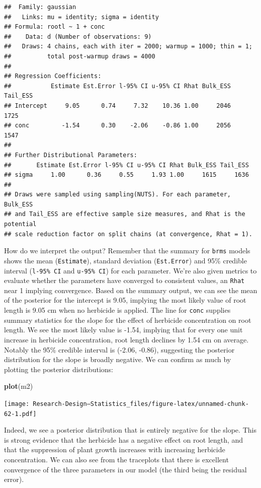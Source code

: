 \documentclass[
]{book}
\newenvironment{Shaded}{\begin{snugshade}}{\end{snugshade}}
\newcommand{\FunctionTok}[1]{\textcolor[rgb]{0.13,0.29,0.53}{\textbf{#1}}}
\newcommand{\NormalTok}[1]{#1}
\begin{document}
\begin{verbatim}
##  Family: gaussian 
##   Links: mu = identity; sigma = identity 
## Formula: rootl ~ 1 + conc 
##    Data: d (Number of observations: 9) 
##   Draws: 4 chains, each with iter = 2000; warmup = 1000; thin = 1;
##          total post-warmup draws = 4000
## 
## Regression Coefficients:
##           Estimate Est.Error l-95% CI u-95% CI Rhat Bulk_ESS Tail_ESS
## Intercept     9.05      0.74     7.32    10.36 1.00     2046     1725
## conc         -1.54      0.30    -2.06    -0.86 1.00     2056     1547
## 
## Further Distributional Parameters:
##       Estimate Est.Error l-95% CI u-95% CI Rhat Bulk_ESS Tail_ESS
## sigma     1.00      0.36     0.55     1.93 1.00     1615     1636
## 
## Draws were sampled using sampling(NUTS). For each parameter, Bulk_ESS
## and Tail_ESS are effective sample size measures, and Rhat is the potential
## scale reduction factor on split chains (at convergence, Rhat = 1).
\end{verbatim}

How do we interpret the output? Remember that the summary for \texttt{brms} models shows the mean (\texttt{Estimate}), standard deviation (\texttt{Est.Error}) and 95\% credible interval (\texttt{l-95\%\ CI} and \texttt{u-95\%\ CI}) for each parameter. We're also given metrics to evaluate whether the parameters have converged to consistent values, an \texttt{Rhat} near 1 implying convergence. Based on the summary output, we can see the mean of the posterior for the intercept is 9.05, implying the most likely value of root length is 9.05 cm when no herbicide is applied. The line for \texttt{conc} supplies summary statistics for the slope for the effect of herbicide concentration on root length. We see the most likely value is -1.54, implying that for every one unit increase in herbicide concentration, root length declines by 1.54 cm on average. Notably the 95\% credible interval is (-2.06, -0.86), suggesting the posterior distribution for the slope is broadly negative. We can confirm as much by plotting the posterior distributions:

\begin{Shaded}
\begin{Highlighting}[]
\FunctionTok{plot}\NormalTok{(m2)}
\end{Highlighting}
\end{Shaded}

\texttt{[image: Research-Design---Statistics\_files/figure-latex/unnamed-chunk-62-1.pdf]}

Indeed, we see a posterior distribution that is entirely negative for the slope. This is strong evidence that the herbicide has a negative effect on root length, and that the suppression of plant growth increases with increasing herbicide concentration. We can also see from the traceplots that there is excellent convergence of the three parameters in our model (the third being the residual error).
\end{document}
